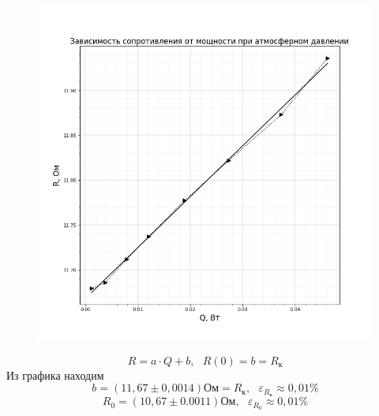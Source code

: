 \documentclass[a4paper,12pt]{article}
\begin{document}
\begin{figure}[H]\label{fig:R(Q)_atm}
    \centering
    \includegraphics[width = \textwidth]{R(Q)_atm.png}
\end{figure}
\[R = a\cdot Q + b, \text{ }R(0) = b = R_к\]
Из графика находим 
\[b = (11,67\pm 0,0014)Ом = R_к, \text{ }\varepsilon_{R_к} \approx 0,01 \% \]
\[R_0 = (10,67 \pm 0.0011)Ом,\text{ }\varepsilon_{R_0} \approx 0,01 \%\]
\end{document}
